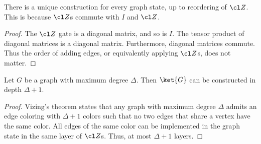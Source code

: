 \begin{fact}
There is a unique construction for every graph state, up to reordering of $\cl Z$. This is because $\cl Z$s commute with $I$ and $\cl Z$.
\begin{proof}
The $\cl Z$ gate is a diagonal matrix, and so is $I$. The tensor product of diagonal matrices is a diagonal matrix. Furthermore, diagonal matrices commute. Thus the order of adding edges, or equivalently applying $\cl Z$s, does not matter.
\end{proof}
\end{fact}

\begin{fact}
\label{fact:graph-circuit-depth}
Let $G$ be a graph with maximum degree $\Delta$. Then $\ket{G}$ can be constructed in depth $\Delta + 1$.
\begin{proof}
Vizing's theorem states that any graph with maximum degree $\Delta$ admits an edge coloring with $\Delta + 1$ colors such that no two edges that share a vertex have the same color. All edges of the same color can be implemented in the graph state in the same layer of $\cl Z$s. Thus, at most $\Delta + 1$ layers.
\end{proof}
\end{fact}

